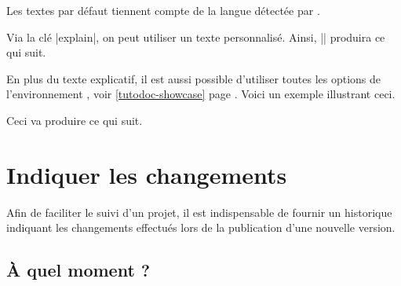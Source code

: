 \begin{tdocnote}
    Les textes par défaut tiennent compte de la langue détectée par \thisproj.
\end{tdocnote}


\begin{tdocexa}
    Via la clé \tdocinlatex|explain|, on peut utiliser un texte personnalisé. Ainsi, \tdocinlatex|| produira ce qui suit.

    \medskip

    \begin{tdocshowcaseDOC}

    \end{tdocshowcaseDOC}
\end{tdocexa}


\begin{tdocexa}
    En plus du texte explicatif, il est aussi possible d'utiliser toutes les options de l'environnement , voir \ref{tutodoc-showcase} page \pageref{tutodoc-showcase}.
    Voici un exemple illustrant ceci.

    \medskip



    \medskip

    Ceci va produire ce qui suit.

    \medskip

    \begin{tdocshowcaseDOC}
        

    \end{tdocshowcaseDOC}
\end{tdocexa}


\section{Indiquer les changements}

Afin de faciliter le suivi d'un projet, il est indispensable de fournir un historique indiquant les changements effectués lors de la publication d'une nouvelle version.



\subsection{À quel moment ?}
\label{tutodoc-changes-when}

